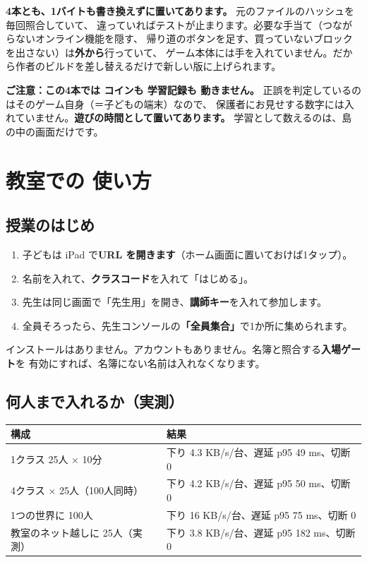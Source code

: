\documentclass[a4paper,10.5pt]{article}
\begin{document}
\begin{notebox}
\textbf{4本とも、1バイトも書き換えずに置いてあります。} 元のファイルのハッシュを毎回照合していて、
違っていればテストが止まります。必要な手当て（つながらないオンライン機能を隠す、
帰り道のボタンを足す、買っていないブロックを出さない）は\textbf{外から}行っていて、
ゲーム本体には手を入れていません。だから作者のビルドを差し替えるだけで新しい版に上げられます。
\end{notebox}

\begin{diffbox}
\textbf{ご注意：この4本では コインも 学習記録も 動きません。}
正誤を判定しているのはそのゲーム自身（＝子どもの端末）なので、
保護者にお見せする数字には入れていません。\textbf{遊びの時間として置いてあります。}
学習として数えるのは、島の中の画面だけです。
\end{diffbox}

\clearpage
\section{教室での 使い方}

\subsection{授業のはじめ}

\begin{enumerate}[leftmargin=18pt, itemsep=2pt]
  \item 子どもは iPad で\textbf{URL を開きます}（ホーム画面に置いておけば1タップ）。
  \item 名前を入れて、\textbf{クラスコード}を入れて「はじめる」。
  \item 先生は同じ画面で「先生用」を開き、\textbf{講師キー}を入れて参加します。
  \item 全員そろったら、先生コンソールの\textbf{「全員集合」}で1か所に集められます。
\end{enumerate}

インストールはありません。アカウントもありません。名簿と照合する\textbf{入場ゲート}を
有効にすれば、名簿にない名前は入れなくなります。

\subsection{何人まで入れるか（実測）}

\begin{center}
\small
\begin{tabular}{@{}p{} p{}@{}}
\toprule
\textbf{構成} & \textbf{結果} \\
\midrule
1クラス 25人 × 10分 & 下り 4.3 KB/s/台、遅延 p95 49 ms、切断 0 \\
4クラス × 25人（100人同時） & 下り 4.2 KB/s/台、遅延 p95 50 ms、切断 0 \\
1つの世界に 100人 & 下り 16 KB/s/台、遅延 p95 75 ms、切断 0 \\
教室のネット越しに 25人（実測） & 下り 3.8 KB/s/台、遅延 p95 182 ms、切断 0 \\
\bottomrule
\end{tabular}
\end{center}
\end{document}
